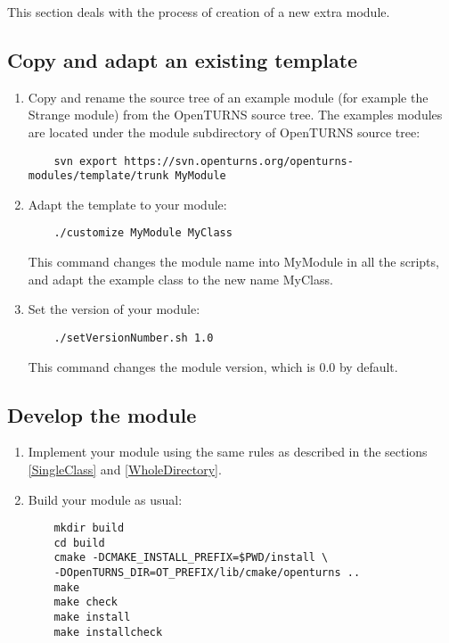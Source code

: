 This section deals with the process of creation of a new extra module.

\subsection{Copy and adapt an existing template}

\begin{enumerate}
\item Copy and rename the source tree of an example module (for example the Strange module) from the OpenTURNS source tree. The examples modules are located under the module subdirectory of OpenTURNS source tree:
  \begin{lstlisting}
    svn export https://svn.openturns.org/openturns-modules/template/trunk MyModule
  \end{lstlisting}
\item Adapt the template to your module:
  \begin{lstlisting}
    ./customize MyModule MyClass
  \end{lstlisting}
  This command changes the module name into MyModule in all the scripts, and adapt the example class to the new name MyClass.
  \setcounter{oldenumi}{\value{enumi}}
\item Set the version of your module:
  \begin{lstlisting}
    ./setVersionNumber.sh 1.0
  \end{lstlisting}
  This command changes the module version, which is 0.0 by default.
  \setcounter{oldenumi}{\value{enumi}}
\end{enumerate}

\subsection{Develop the module}
\begin{enumerate}
  \setcounter{enumi}{\value{oldenumi}}
\item Implement your module using the same rules as described in the sections \ref{SingleClass} and \ref{WholeDirectory}.
\item Build your module as usual:
  \begin{lstlisting}
    mkdir build
    cd build
    cmake -DCMAKE_INSTALL_PREFIX=$PWD/install \
    -DOpenTURNS_DIR=OT_PREFIX/lib/cmake/openturns ..
    make
    make check
    make install
    make installcheck
  \end{lstlisting}
  \setcounter{oldenumi}{\value{enumi}}
\end{enumerate}

